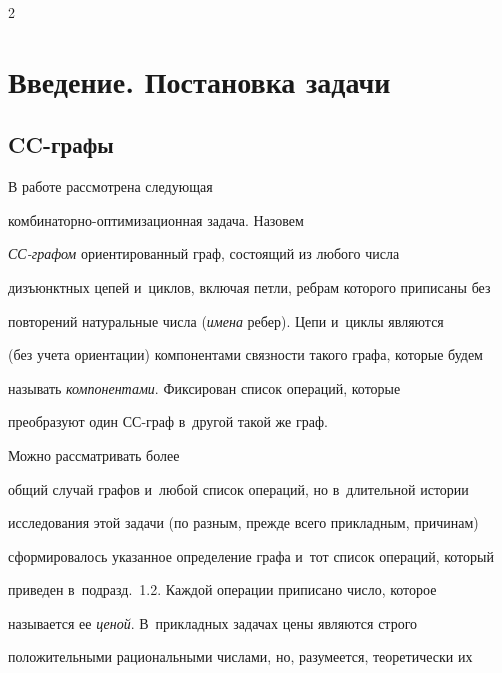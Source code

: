 \begin{multicols}{2}





\label{st\stat}





  \section{Введение. Постановка задачи}


   


  \subsection{CC-графы}


  


  В работе рассмотрена следующая  


ком\-би\-на\-тор\-но-оп\-ти\-ми\-за\-ци\-он\-ная задача. Назовем  


\textit{СС-гра\-фом} ориентированный граф, состоящий из любого чис\-ла 


дизъюнктных цепей и~циклов, включая петли, реб\-рам которого приписаны без 


повторений натуральные числа (\textit{имена} ре\-бер). Цепи и~циклы являются 


(без учета ориентации) компонентами связности такого графа, которые будем 


называть \textit{компонента\-ми}. Фиксирован список операций, которые 


преобразуют один СС-граф в~другой такой же граф. 





Можно рассматривать более 


общий случай графов и~любой список операций, но в~длительной истории 


исследования этой задачи (по разным, прежде всего прикладным, причинам) 


сформировалось указанное определение графа и~тот список операций, который 


приведен в~подразд.~1.2. Каж\-дой операции приписано число, которое 


называется ее \textit{ценой}. В~прикладных задачах цены являются строго 


положительными рациональными числами, но, разумеется, теоретически их 



\end{multicols}
